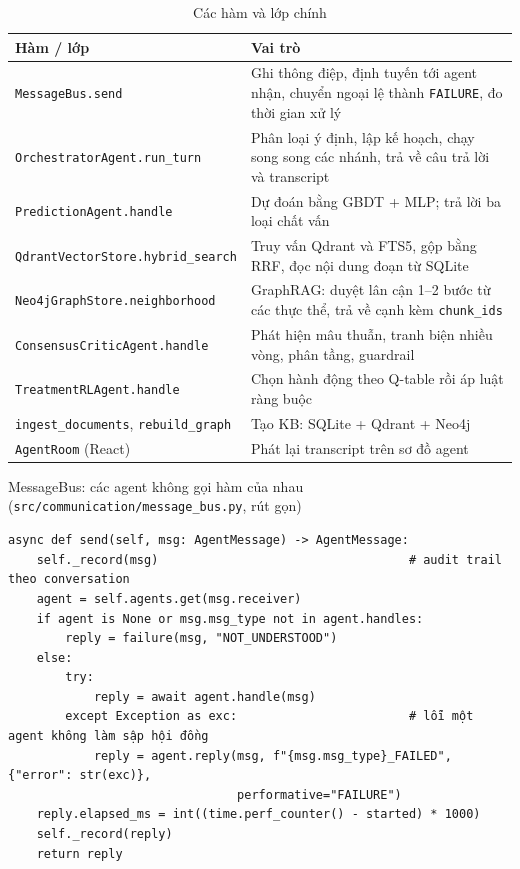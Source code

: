 \begin{table}[H]
\centering
\caption{Các hàm và lớp chính}
\label{tab:functions}
\small
\begin{tabularx}{\linewidth}{@{}L{5.2cm}Y@{}}
\toprule
\textbf{Hàm / lớp} & \textbf{Vai trò} \\
\midrule
\texttt{MessageBus.send} & Ghi thông điệp, định tuyến tới agent nhận, chuyển ngoại lệ thành \texttt{FAILURE}, đo thời gian xử lý \\
\texttt{OrchestratorAgent.run\_turn} & Phân loại ý định, lập kế hoạch, chạy song song các nhánh, trả về câu trả lời và transcript \\
\texttt{PredictionAgent.handle} & Dự đoán bằng GBDT + MLP; trả lời ba loại chất vấn \\
\texttt{QdrantVectorStore.hybrid\_search} & Truy vấn Qdrant và FTS5, gộp bằng RRF, đọc nội dung đoạn từ SQLite \\
\texttt{Neo4jGraphStore.neighborhood} & GraphRAG: duyệt lân cận 1–2 bước từ các thực thể, trả về cạnh kèm \texttt{chunk\_ids} \\
\texttt{ConsensusCriticAgent.handle} & Phát hiện mâu thuẫn, tranh biện nhiều vòng, phân tầng, guardrail \\
\texttt{TreatmentRLAgent.handle} & Chọn hành động theo Q-table rồi áp luật ràng buộc \\
\texttt{ingest\_documents}, \texttt{rebuild\_graph} & Tạo KB: SQLite + Qdrant + Neo4j \\
\texttt{AgentRoom} (React) & Phát lại transcript trên sơ đồ agent \\
\bottomrule
\end{tabularx}
\end{table}

\begin{code}{MessageBus: các agent không gọi hàm của nhau (\texttt{src/communication/message\_bus.py}, rút gọn)}
\label{lst:bus}
\begin{verbatim}
async def send(self, msg: AgentMessage) -> AgentMessage:
    self._record(msg)                                   # audit trail theo conversation
    agent = self.agents.get(msg.receiver)
    if agent is None or msg.msg_type not in agent.handles:
        reply = failure(msg, "NOT_UNDERSTOOD")
    else:
        try:
            reply = await agent.handle(msg)
        except Exception as exc:                        # lỗi một agent không làm sập hội đồng
            reply = agent.reply(msg, f"{msg.msg_type}_FAILED", {"error": str(exc)},
                                performative="FAILURE")
    reply.elapsed_ms = int((time.perf_counter() - started) * 1000)
    self._record(reply)
    return reply
\end{verbatim}
\end{code}

